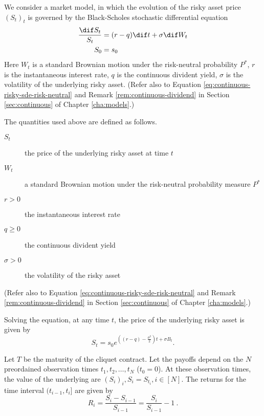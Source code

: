 We consider a market model, in which the evolution of the risky asset price $ (S_t)_t $ is governed by the Black-Scholes stochastic differential equation
\begin{subequations}
	\begin{align*}
		\frac{\dif S_t}{S_t}  &=  (r - q) \dif t + \sigma \dif W_t  \\
		S_0  &=  s_0
	\end{align*}
\end{subequations}
Here $ W_t $ is a standard Brownian motion under the risk-neutral probability $ P^* $, $ r $ is the instantaneous interest rate, $ q $ is the continuous divident yield, $ \sigma $ is the volatility of the underlying risky asset. (Refer also to Equation \ref{eq:continuous-risky-sde-risk-neutral} and Remark \ref{rem:continuous-dividend} in Section \ref{sec:continuous} of Chapter \ref{cha:models}.)

The quantities used above are defined as follows.
\begin{description}
	\item[$ S_t $] the price of the underlying risky asset at time $t$
	\item[$ W_t $] a standard Brownian motion under the risk-neutral probability measure $ P^* $
	\item[$ r > 0 $] the instantaneous interest rate
	\item[$ q \ge 0 $] the continuous divident yield
	\item[$ \sigma > 0 $] the volatility of the risky asset
\end{description}
(Refer also to Equation \ref{eq:continuous-risky-sde-risk-neutral} and Remark \ref{rem:continuous-dividend} in Section \ref{sec:continuous} of Chapter \ref{cha:models}.)

Solving the equation, at any time $ t $, the price of the underlying risky asset is given by
\begin{equation*}
	\label{eq:clq-risky-prc}
	S_t = s_0 e^{ ( (r - q) - \frac{\sigma^2}{2} )t + \sigma B_t }.
\end{equation*}

Let $T$ be the maturity of the cliquet contract. Let the payoffs depend on the $ N $ preordained observation times $ t_1, t_2, \dots, t_{N} $ ($ t_0 = 0 $). At these observation times, the value of the underlying are $ ( S_i )_i, S_i = S_{t_i}, i \in \left[ N \right] $. The returns for the time interval $ ( t_{i-1}, t_i ] $ are given by
\begin{equation}
	\label{eq:clq-return}
	R_i = \frac{S_i - S_{i-1}}{S_{i-1}} = \frac{S_i}{S_{i-1}} - 1 \ .
\end{equation}

